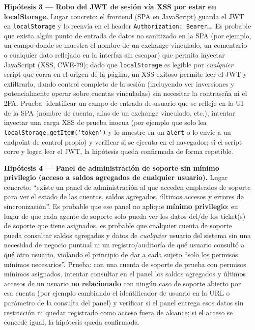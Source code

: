 \textbf{Hipótesis 3 --- Robo del JWT de sesión vía XSS por estar en localStorage.} Lugar
concreto: el frontend (SPA en JavaScript) guarda el JWT en \texttt{localStorage} y lo reenvía
en el header \texttt{Authorization: Bearer\ldots}. Es probable que exista algún punto de
entrada de datos no sanitizado en la SPA (por ejemplo, un campo donde se muestra el nombre de
un exchange vinculado, un comentario o cualquier dato reflejado en la interfaz sin escapar)
que permita inyectar JavaScript (XSS, CWE-79); dado que \texttt{localStorage} es legible por
\emph{cualquier} script que corra en el origen de la página, un XSS exitoso permite leer el
JWT y exfiltrarlo, dando control completo de la sesión (incluyendo ver inversiones y
potencialmente operar sobre cuentas vinculadas) sin necesitar la contraseña ni el 2FA.
Prueba: identificar un campo de entrada de usuario que se refleje en la UI de la SPA (nombre
de cuenta, alias de un exchange vinculado, etc.), intentar inyectar una carga XSS de prueba
inocua (por ejemplo que solo lea \texttt{localStorage.getItem('token')} y lo muestre en un
\texttt{alert} o lo envíe a un endpoint de control propio) y verificar si se ejecuta en el
navegador; si el script corre y logra leer el JWT, la hipótesis queda confirmada de forma
repetible.

\textbf{Hipótesis 4 --- Panel de administración de soporte sin mínimo privilegio (acceso a
saldos agregados de cualquier usuario).} Lugar concreto: ``existe un panel de administración
al que acceden empleados de soporte para ver el estado de las cuentas, saldos agregados,
últimos accesos y errores de sincronización''. Es probable que ese panel no aplique
\textbf{mínimo privilegio}: en lugar de que cada agente de soporte solo pueda ver los datos
del/de los ticket(s) de soporte que tiene asignados, es probable que cualquier cuenta de
soporte pueda consultar saldos agregados y datos de \emph{cualquier} usuario del sistema sin
una necesidad de negocio puntual ni un registro/auditoría de qué usuario consultó a qué otro
usuario, violando el principio de dar a cada sujeto ``solo los permisos mínimos necesarios''.
Prueba: con una cuenta de soporte de prueba con permisos mínimos asignados, intentar consultar
en el panel los saldos agregados y últimos accesos de un usuario \textbf{no relacionado} con
ningún caso de soporte abierto por esa cuenta (por ejemplo cambiando el identificador de
usuario en la URL o parámetro de la consulta del panel) y verificar si el panel entrega esos
datos sin restricción ni quedar registrado como acceso fuera de alcance; si el acceso se
concede igual, la hipótesis queda confirmada.

